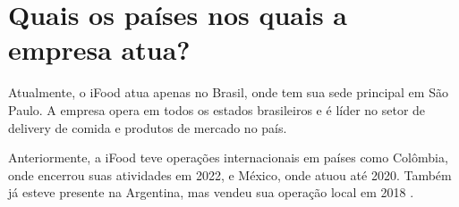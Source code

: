 \section{Quais os países nos quais a empresa atua?}

Atualmente, o iFood atua apenas no Brasil, onde tem sua sede principal em São Paulo. A empresa opera em todos os estados brasileiros e é líder no setor de delivery de comida e produtos de mercado no país.

Anteriormente, a iFood teve operações internacionais em países como Colômbia, onde encerrou suas atividades em 2022, e México, onde atuou até 2020. Também já esteve presente na Argentina, mas vendeu sua operação local em 2018 \cite{ifood2023history}.

